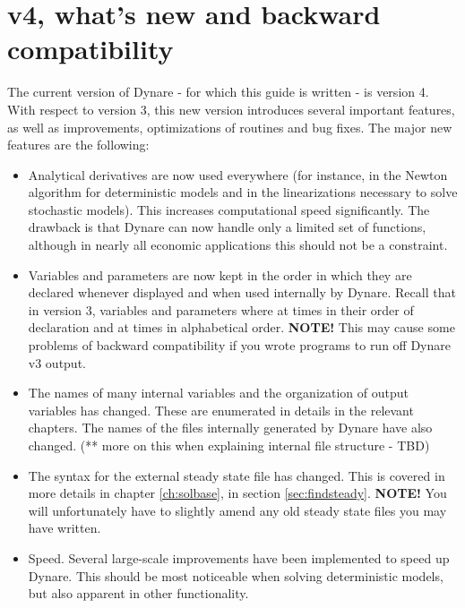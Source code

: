\section{v4, what's new and backward compatibility}
The current version of Dynare - for which this guide is written - is version 4. With respect to version 3, this new version introduces several important features, as well as improvements, optimizations of routines and bug fixes. The major new features are the following: 
\begin{itemize}
\item Analytical derivatives are now used everywhere (for instance, in the Newton algorithm for deterministic models and in the linearizations necessary to solve stochastic models). This increases computational speed significantly. The drawback is that Dynare can now handle only a limited set of functions, although in nearly all economic applications this should not be a constraint. 
\item Variables and parameters are now kept in the order in which they are declared whenever displayed and when used internally by Dynare. Recall that in version 3, variables and parameters where at times in their order of declaration and at times in alphabetical order. \textbf{\textsf{NOTE!}} This may cause some problems of backward compatibility if you wrote programs to run off Dynare v3 output.
\item The names of many internal variables and the organization of output variables has changed. These are enumerated in details in the relevant chapters. The names of the files internally generated by Dynare have also changed. (** more on this when explaining internal file structure - TBD)
\item The syntax for the external steady state file has changed. This is covered in more details in chapter \ref{ch:solbase}, in section \ref{sec:findsteady}. \textbf{\textsf{NOTE!}} You will unfortunately have to slightly amend any old steady state files you may have written. 
\item Speed. Several large-scale improvements have been implemented to speed up Dynare. This should be most noticeable when solving deterministic models, but also apparent in other functionality.
\end{itemize}


 

